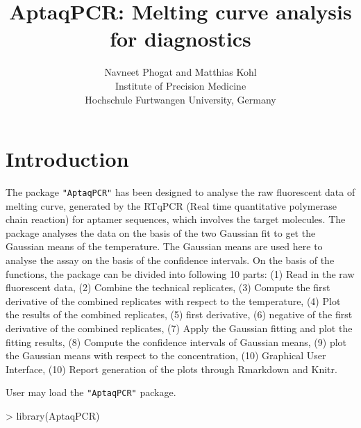 \documentclass[11pt]{article}
\newcommand{\pkg}[1]{{\tt "#1"}}
\begin{document}



\title{AptaqPCR: Melting curve analysis for diagnostics}
\author{Navneet Phogat and Matthias Kohl\\
Institute of Precision Medicine\\
Hochschule Furtwangen University, Germany\medskip\\
}
\maketitle
\tableofcontents
\section{Introduction}
The package \pkg{AptaqPCR} has been designed to analyse the raw fluorescent data of melting curve, generated by the RTqPCR (Real time quantitative polymerase chain reaction) for aptamer sequences,
which involves the target molecules. The package analyses the data on the basis of the two Gaussian
fit to get the Gaussian means of the temperature. The Gaussian means are used here to analyse the
assay on the basis of the confidence intervals. On the basis of the functions, the package can be divided into following 10 parts: (1) Read in the raw fluorescent data, (2) Combine the technical
replicates, (3) Compute the first derivative of the combined replicates with respect to the temperature, (4) Plot the results of the combined replicates, (5) first derivative, (6) negative of the first derivative of the combined replicates, (7) Apply the Gaussian fitting and plot the fitting results, (8) Compute the confidence intervals of Gaussian means, (9) plot the Gaussian means with respect to the concentration, (10) Graphical User Interface, (10) Report generation of the plots through Rmarkdown and Knitr.

User may load the \pkg{AptaqPCR} package.
\begin{Schunk}
\begin{Sinput}
> library(AptaqPCR)
\end{Sinput}
\end{Schunk}

\end{document}
